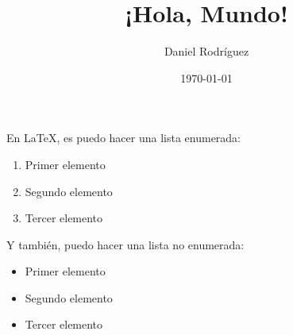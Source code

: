 \documentclass{article}
\title{¡Hola, Mundo!}
\author{Daniel Rodríguez}
\date{\today}
\begin{document}
\maketitle

En \LaTeX, es puedo hacer una lista enumerada:
\begin{enumerate}
\item Primer elemento
\item Segundo elemento
\item Tercer elemento
\end{enumerate}

Y también, puedo hacer una lista no enumerada:
\begin{itemize}
\item Primer elemento
\item Segundo elemento
\item Tercer elemento
\end{itemize}
\end{document}
